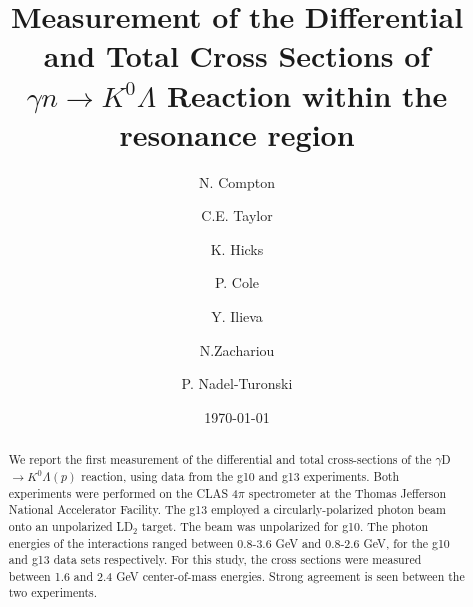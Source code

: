 \documentclass[prb,10pt,twocolumn,tightenlines,superscriptaddress]{revtex4-1}
\begin{document}
\title{Measurement of the Differential and Total Cross Sections of $\gamma n \longrightarrow K^{0}\Lambda$ Reaction within the resonance region}
\author{N. Compton}
\author{C.E. Taylor}
\author{K. Hicks}
\author {P. Cole}
\author{Y. Ilieva}
\author{N.Zachariou}
\author{P. Nadel-Turonski}

\date{\today}

\begin{abstract}
We report the first measurement of the differential and total cross-sections  of the  $\gamma$D $\longrightarrow K^{0}\Lambda(p)$ reaction, using data from the g10 and g13 experiments. Both experiments were performed on the CLAS 4$\pi$ spectrometer at the Thomas Jefferson National Accelerator Facility. The g13 employed a circularly-polarized photon beam onto an unpolarized LD$_{2}$ target. The beam was unpolarized for g10. The photon energies of the interactions ranged between 0.8-3.6 GeV and 0.8-2.6 GeV, for the g10 and g13 data sets respectively. For this study, the cross sections were measured between 1.6 and 2.4 GeV center-of-mass energies. Strong agreement is seen between the two experiments. 
\end{abstract}

\maketitle

\end{document}
